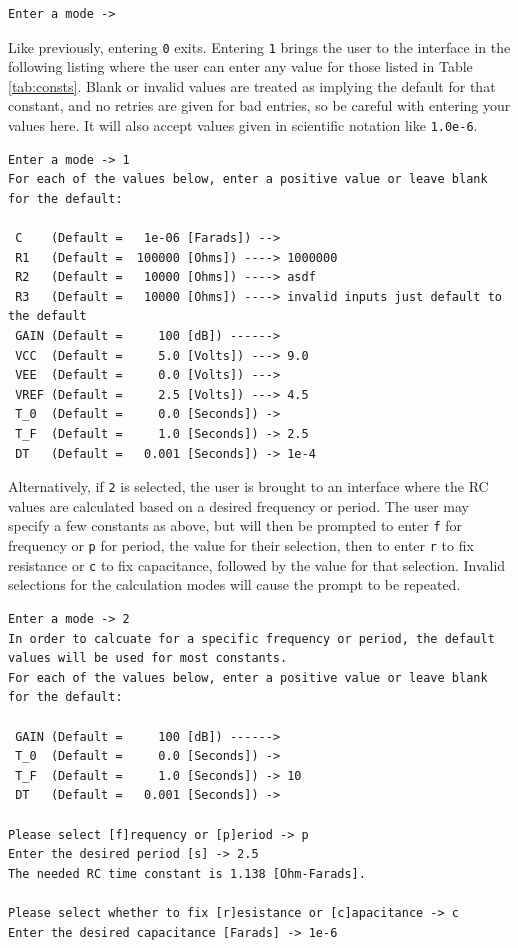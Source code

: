 \documentclass[12pt]{article}
\begin{document}
\begin{appendix}
\begin{lstlisting}[basicstyle=\ttfamily,frame=tb,breaklines=true]
Enter a mode -> 
\end{lstlisting}
Like previously, entering \texttt{0} exits. Entering \texttt{1} brings the user to the interface in the following listing where the user can enter any value for those listed in Table \ref{tab:consts}. Blank or invalid values are treated as implying the default for that constant, and no retries are given for bad entries, so be careful with entering your values here. It will also accept values given in scientific notation like \texttt{1.0e-6}.
\clearpage
\begin{lstlisting}[basicstyle=\ttfamily,frame=tb,breaklines=true]
Enter a mode -> 1
For each of the values below, enter a positive value or leave blank for the default:

 C    (Default =   1e-06 [Farads]) --> 
 R1   (Default =  100000 [Ohms]) ----> 1000000
 R2   (Default =   10000 [Ohms]) ----> asdf
 R3   (Default =   10000 [Ohms]) ----> invalid inputs just default to the default
 GAIN (Default =     100 [dB]) ------> 
 VCC  (Default =     5.0 [Volts]) ---> 9.0
 VEE  (Default =     0.0 [Volts]) ---> 
 VREF (Default =     2.5 [Volts]) ---> 4.5
 T_0  (Default =     0.0 [Seconds]) -> 
 T_F  (Default =     1.0 [Seconds]) -> 2.5
 DT   (Default =   0.001 [Seconds]) -> 1e-4
\end{lstlisting}
Alternatively, if \texttt{2} is selected, the user is brought to an interface where the RC values are calculated based on a desired frequency or period. The user may specify a few constants as above, but will then be prompted to enter \texttt{f} for frequency or \texttt{p} for period, the value for their selection, then to enter \texttt{r} to fix resistance or \texttt{c} to fix capacitance, followed by the value for that selection. Invalid selections for the calculation modes will cause the prompt to be repeated.
\begin{lstlisting}[basicstyle=\ttfamily,frame=tb,breaklines=true]
Enter a mode -> 2
In order to calcuate for a specific frequency or period, the default values will be used for most constants.
For each of the values below, enter a positive value or leave blank for the default:

 GAIN (Default =     100 [dB]) ------> 
 T_0  (Default =     0.0 [Seconds]) -> 
 T_F  (Default =     1.0 [Seconds]) -> 10
 DT   (Default =   0.001 [Seconds]) -> 

Please select [f]requency or [p]eriod -> p
Enter the desired period [s] -> 2.5
The needed RC time constant is 1.138 [Ohm-Farads].

Please select whether to fix [r]esistance or [c]apacitance -> c
Enter the desired capacitance [Farads] -> 1e-6
\end{lstlisting}


\end{appendix}
\end{document}
